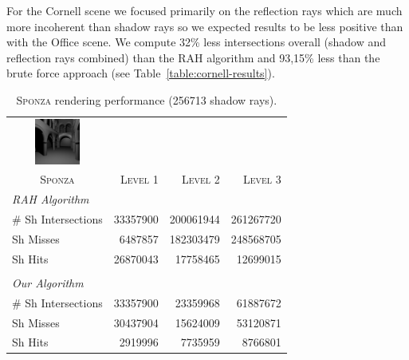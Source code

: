 \documentclass{egpubl}
\begin{document}
For the Cornell scene we focused primarily on the reflection rays which are much more incoherent than shadow rays so we expected results to be less positive than with the Office scene. We compute 32\% less intersections overall (shadow and reflection rays combined) than the RAH algorithm and 93,15\% less than the brute force approach (see Table~\ref{table:cornell-results}).

\begin{table}[!htb]
\begin{center}
\fontsize{7}{9}
\selectfont
\begin{tabular}{l|rrr}
    \multicolumn{1}{c}{\includegraphics[width=1.5cm]{images/sponza}} & & \\
    \multicolumn{1}{c|}{\textsc{Sponza}} & \textsc{Level 1} & \textsc{Level 2} & \textsc{Level 3}\\
    \hline
    \emph{RAH Algorithm} & & \\
    \hline
    \quad \# Sh Intersections  & 33357900	 & 200061944    & 261267720  \\
    \quad Sh Misses            & 6487857	 & 182303479    & 248568705	 \\
    \quad Sh Hits              & 26870043	 & 17758465	    & 12699015	 \\

    & & \\

    \hline
    \emph{Our Algorithm} & & \\
    \hline    
    \quad \# Sh Intersections  & 33357900	& 23359968	& 61887672	 \\
    \quad Sh Misses            & 30437904	& 15624009	& 53120871	 \\
    \quad Sh Hits              & 2919996	& 7735959	& 8766801	 \\
\end{tabular}
\end{center}
\caption{\label{table:sponza-results}
\textsc{Sponza} rendering performance (256713 shadow rays).}
\end{table}
\end{document}
